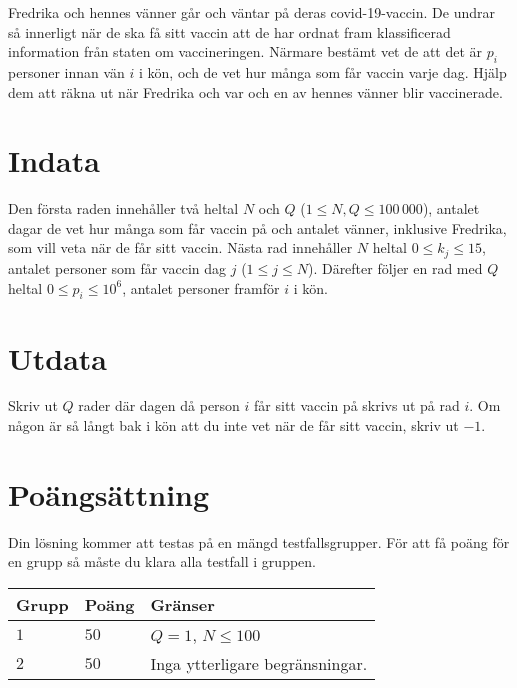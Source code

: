 
Fredrika och hennes vänner går och väntar på deras covid-19-vaccin. De undrar så innerligt när de ska få sitt vaccin att de har ordnat fram klassificerad information från staten om vaccineringen. Närmare bestämt vet de att det är $p_i$ personer innan vän $i$ i kön, och de vet hur många som får vaccin varje dag. Hjälp dem att räkna ut när Fredrika och var och en av hennes vänner blir vaccinerade. 

\section*{Indata}
Den första raden innehåller två heltal $N$ och $Q$ ($1 \le N,Q \le 100\,000$), antalet dagar de vet hur många som får vaccin på och antalet vänner, inklusive Fredrika, som vill veta när de får sitt vaccin. Nästa rad innehåller $N$ heltal $0 \le k_j \le 15$, antalet personer som får vaccin dag $j$ ($1 \le j \le N$). Därefter följer en rad med $Q$ heltal $0 \le p_i \le 10^6$, antalet personer framför $i$ i kön.

\section*{Utdata}
Skriv ut $Q$ rader där dagen då person $i$ får sitt vaccin på skrivs ut på rad $i$. Om någon är så långt bak i kön att du inte vet när de får sitt vaccin, skriv ut $-1$.

\section*{Poängsättning}
Din lösning kommer att testas på en mängd testfallsgrupper.
För att få poäng för en grupp så måste du klara alla testfall i gruppen.

\noindent
\begin{tabular}{| l | l | l |}
  \hline
  \textbf{Grupp} & \textbf{Poäng} & \textbf{Gränser} \\ \hline
  $1$ & $50$ & $Q=1$, $N \le 100$ \\ \hline
  $2$ & $50$ & Inga ytterligare begränsningar. \\ \hline
\end{tabular}
